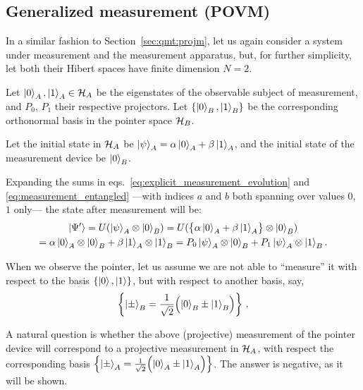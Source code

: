 \subsection{Generalized measurement (POVM)}
\label{subsec:POVM}

In a similar fashion to
Section~\ref{sec:qmt:projm},
let us again consider
a system under measurement
and the measurement apparatus,
but, for further simplicity, let both their Hibert spaces have finite dimension $N=2$.

Let $\ket{0}_A, \ket{1}_A \in \mathcal{H}_A$ be the eigenstates 
of the observable subject of measurement,
and $P_0$, $P_1$ their respective projectors.
Let $\qty{\ket{0}_B, \ket{1}_B}$ be the corresponding orthonormal basis in the pointer space $\mathcal{H}_B$.

Let the initial state in $\mathcal{H}_A$ be $\ket{\psi}_A = \alpha\ket{0}_A + \beta\ket{1}_A$,
and the initial state of the measurement device be $\ket{0}_B$.

Expanding the sums in eqs.~\eqref{eq:explicit_measurement_evolution}
and \eqref{eq:measurement_entangled}
---with indices $a$ and $b$ both spanning over values $0$, $1$ only---
the state after measurement will be:
\begin{multline}\label{eq:qubit_ortho_measurement}
        \ket{\Psi'}
    = U( \ket{\psi}_A \otimes \ket{0}_B )
    = U( \qty\big{\alpha\ket{0}_A + \beta\ket{1}_A} \otimes \ket{0}_B )
    \\
    = \alpha\ket{0}_A \otimes \ket{0}_B + \beta\ket{1}_A  \otimes \ket{1}_B
    = P_0\ket{\psi}_A \otimes \ket{0}_B + P_1\ket{\psi}_A \otimes \ket{1}_B \text{.}
\end{multline}

When we observe the pointer, let us assume we are not
able to ``measure'' it with respect to the basis
$\left\{\ket{0}, \ket{1}\right\}$,
but with respect to another basis, say,
\begin{equation}\label{eq:pmbasis}
\left\{\ket{\pm}_B = \frac{1}{\sqrt{2}} \qty\Big(\ket{0}_B \pm \ket{1}_B)\right\} \,\text{.}
\end{equation}

A natural question is whether the above (projective) measurement
of the pointer device
will correspond to a projective
measurement in $\mathcal{H}_A$,
with respect the corresponding basis
$\left\{\ket{\pm}_A = \frac{1}{\sqrt{2}} \qty\Big(\ket{0}_A \pm \ket{1}_A)\right\}$.
The answer is negative, as it will be shown.

